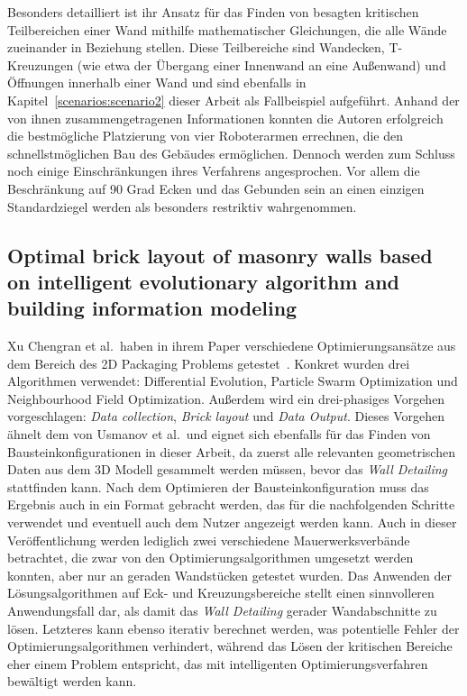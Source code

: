 Besonders detailliert ist ihr Ansatz für das Finden von besagten kritischen Teilbereichen einer Wand mithilfe mathematischer Gleichungen, die alle Wände zueinander in Beziehung stellen.
Diese Teilbereiche sind Wandecken, T-Kreuzungen (wie etwa der Übergang einer Innenwand an eine Außenwand) und Öffnungen innerhalb einer Wand und sind ebenfalls in Kapitel~\ref{scenarios:scenario2} dieser Arbeit als Fallbeispiel aufgeführt.
Anhand der von ihnen zusammengetragenen Informationen konnten die Autoren erfolgreich die bestmögliche Platzierung von vier Roboterarmen errechnen, die den schnellstmöglichen Bau des Gebäudes ermöglichen.
Dennoch werden zum Schluss noch einige Einschränkungen ihres Verfahrens angesprochen.
Vor allem die Beschränkung auf 90 Grad Ecken und das Gebunden sein an einen einzigen Standardziegel werden als besonders restriktiv wahrgenommen.

\subsection{Optimal brick layout of masonry walls based on intelligent evolutionary algorithm and building information modeling}
Xu Chengran et al.\ haben in ihrem Paper verschiedene Optimierungsansätze aus dem Bereich des 2D Packaging Problems getestet~\cite{Xu2021}.
Konkret wurden drei Algorithmen verwendet: Differential Evolution, Particle Swarm Optimization und Neighbourhood Field Optimization.
Außerdem wird ein drei-phasiges Vorgehen vorgeschlagen: \textit{Data collection}, \textit{Brick layout} und \textit{Data Output}.
Dieses Vorgehen ähnelt dem von Usmanov et al.\ und eignet sich ebenfalls für das Finden von Bausteinkonfigurationen in dieser Arbeit, da zuerst alle relevanten geometrischen Daten aus dem 3D Modell gesammelt werden müssen, bevor das \textit{Wall Detailing} stattfinden kann.
Nach dem Optimieren der Bausteinkonfiguration muss das Ergebnis auch in ein Format gebracht werden, das für die nachfolgenden Schritte verwendet und eventuell auch dem Nutzer angezeigt werden kann.
Auch in dieser Veröffentlichung werden lediglich zwei verschiedene Mauerwerksverbände betrachtet, die zwar von den Optimierungsalgorithmen umgesetzt werden konnten, aber nur an geraden Wandstücken getestet wurden.
Das Anwenden der Lösungsalgorithmen auf Eck- und Kreuzungsbereiche stellt einen sinnvolleren Anwendungsfall dar, als damit das \textit{Wall Detailing} gerader Wandabschnitte zu lösen.
Letzteres kann ebenso iterativ berechnet werden, was potentielle Fehler der Optimierungsalgorithmen verhindert, während das Lösen der kritischen Bereiche eher einem Problem entspricht, das mit \glqq{}intelligenten\grqq{} Optimierungsverfahren bewältigt werden kann. 

